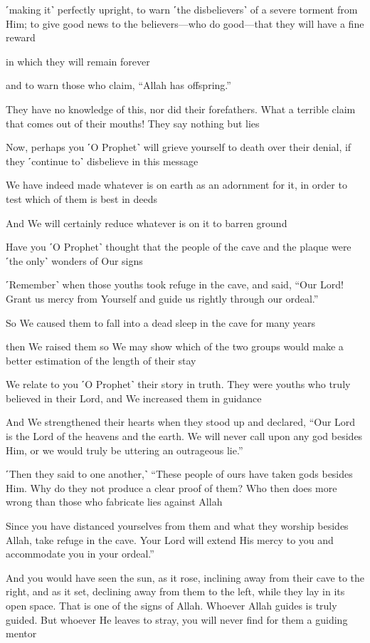 ˹making it˺ perfectly upright, to warn ˹the disbelievers˺ of a severe torment from Him; to give good news to the believers—who do good—that they will have a fine reward

in which they will remain forever

and to warn those who claim, “Allah has offspring.”

They have no knowledge of this, nor did their forefathers. What a terrible claim that comes out of their mouths! They say nothing but lies

Now, perhaps you ˹O Prophet˺ will grieve yourself to death over their denial, if they ˹continue to˺ disbelieve in this message

We have indeed made whatever is on earth as an adornment for it, in order to test which of them is best in deeds

And We will certainly reduce whatever is on it to barren ground

Have you ˹O Prophet˺ thought that the people of the cave and the plaque were ˹the only˺ wonders of Our signs

˹Remember˺ when those youths took refuge in the cave, and said, “Our Lord! Grant us mercy from Yourself and guide us rightly through our ordeal.”

So We caused them to fall into a dead sleep in the cave for many years

then We raised them so We may show which of the two groups would make a better estimation of the length of their stay

We relate to you ˹O Prophet˺ their story in truth. They were youths who truly believed in their Lord, and We increased them in guidance

And We strengthened their hearts when they stood up and declared, “Our Lord is the Lord of the heavens and the earth. We will never call upon any god besides Him, or we would truly be uttering an outrageous lie.”

˹Then they said to one another,˺ “These people of ours have taken gods besides Him. Why do they not produce a clear proof of them? Who then does more wrong than those who fabricate lies against Allah

Since you have distanced yourselves from them and what they worship besides Allah, take refuge in the cave. Your Lord will extend His mercy to you and accommodate you in your ordeal.”

And you would have seen the sun, as it rose, inclining away from their cave to the right, and as it set, declining away from them to the left, while they lay in its open space. That is one of the signs of Allah. Whoever Allah guides is truly guided. But whoever He leaves to stray, you will never find for them a guiding mentor

